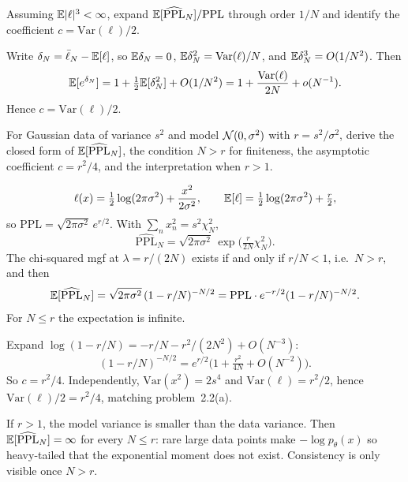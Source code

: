 \begin{hwqbox}
Assuming $\mathbb{E}|\ell|^3<\infty$, expand $\mathbb{E}[\widehat{\mathrm{PPL}}_N]/\mathrm{PPL}$ through order $1/N$ and identify the coefficient $c=\mathrm{Var}(\ell)/2$.
\end{hwqbox}
\begin{hwsolbox}
Write $\delta_N=\bar\ell_N-\mathbb{E}[\ell]$, so $\mathbb{E}\delta_N=0$, $\mathbb{E}\delta_N^2=\mathrm{Var}(\ell)/N$, and $\mathbb{E}\delta_N^3=O(1/N^2)$. Then
\[
\mathbb{E}[e^{\delta_N}]=1+\tfrac12\mathbb{E}[\delta_N^2]+O(1/N^2)=1+\frac{\mathrm{Var}(\ell)}{2N}+o(N^{-1}).
\]
Hence $c=\mathrm{Var}(\ell)/2$.
\end{hwsolbox}

\begin{hwqbox}
For Gaussian data of variance $s^2$ and model $\mathcal{N}(0,\sigma^2)$ with $r=s^2/\sigma^2$, derive the closed form of $\mathbb{E}[\widehat{\mathrm{PPL}}_N]$, the condition $N>r$ for finiteness, the asymptotic coefficient $c=r^2/4$, and the interpretation when $r>1$.
\end{hwqbox}
\begin{hwsolbox}
\[
\ell(x)=\tfrac12\log(2\pi\sigma^2)+\frac{x^2}{2\sigma^2},\qquad
\mathbb{E}[\ell]=\tfrac12\log(2\pi\sigma^2)+\tfrac r2,
\]
so $\mathrm{PPL}=\sqrt{2\pi\sigma^2}\,e^{r/2}$. With $\sum_n x_n^2=s^2\chi^2_N$,
\[
\widehat{\mathrm{PPL}}_N=\sqrt{2\pi\sigma^2}\,\exp\big(\tfrac{r}{2N}\chi^2_N\big).
\]
The chi-squared mgf at $\lambda=r/(2N)$ exists if and only if $r/N<1$, i.e.\ $N>r$, and then
\[
\mathbb{E}[\widehat{\mathrm{PPL}}_N]=\sqrt{2\pi\sigma^2}\,(1-r/N)^{-N/2}
=\mathrm{PPL}\cdot e^{-r/2}(1-r/N)^{-N/2}.
\]
For $N\le r$ the expectation is infinite.

Expand $\log(1-r/N)=-r/N-r^2/(2N^2)+O(N^{-3})$:
\[
(1-r/N)^{-N/2}=e^{r/2}\big(1+\tfrac{r^2}{4N}+O(N^{-2})\big).
\]
So $c=r^2/4$. Independently, $\mathrm{Var}(x^2)=2s^4$ and $\mathrm{Var}(\ell)=r^2/2$, hence $\mathrm{Var}(\ell)/2=r^2/4$, matching problem~2.2(a).

If $r>1$, the model variance is smaller than the data variance. Then $\mathbb{E}[\widehat{\mathrm{PPL}}_N]=\infty$ for every $N\le r$: rare large data points make $-\log p_\theta(x)$ so heavy-tailed that the exponential moment does not exist. Consistency is only visible once $N>r$.
\end{hwsolbox}
